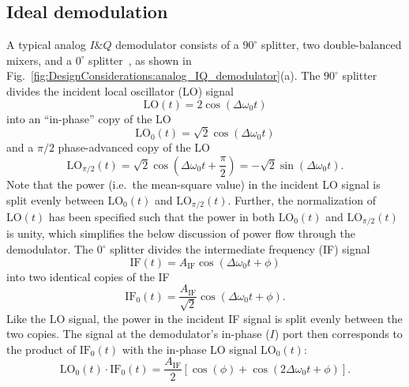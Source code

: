\subsection{Ideal demodulation}
\label{sec:DesignConsiderations:demodulation:ideal}
A typical analog $I\&Q$ demodulator consists of
a $90^{\circ}$ splitter,
two double-balanced mixers, and
a $0^{\circ}$ splitter~\cite{minicircuits_modulators}, as shown in
Fig.~\ref{fig:DesignConsiderations:analog_IQ_demodulator}(a).
The $90^{\circ}$ splitter divides the incident local oscillator (LO) signal
\begin{equation}
  \text{LO}(t) = 2 \cos(\Delta\omega_0 t)
\end{equation}
into an ``in-phase'' copy of the LO
\begin{equation}
  \text{LO}_0(t)
  =
  \sqrt{2} \cos(\Delta\omega_0 t)
\end{equation}
and a $\pi / 2$ phase-advanced copy of the LO
\begin{equation}
  \text{LO}_{\pi / 2}(t)
  =
  \sqrt{2} \cos\left( \Delta\omega_0 t + \frac{\pi}{2} \right)
  =
  -\sqrt{2} \sin(\Delta\omega_0 t).
\end{equation}
Note that the power (i.e.\ the mean-square value) in the incident LO signal
is split evenly between $\text{LO}_0(t)$ and $\text{LO}_{\pi / 2}(t)$.
Further, the normalization of $\text{LO}(t)$ has been specified such that
the power in both $\text{LO}_0(t)$ and $\text{LO}_{\pi / 2}(t)$ is unity,
which simplifies the below discussion of power flow through the demodulator.
The $0^{\circ}$ splitter divides the intermediate frequency (IF) signal
\begin{equation}
  \text{IF}(t) = A_{\text{IF}} \cos(\Delta\omega_0 t + \phi)
  \label{eq:DesignConsiderations:IF_perfect_sinusoid}
\end{equation}
into two identical copies of the IF
\begin{equation}
  \text{IF}_0(t)
  =
  \frac{A_{\text{IF}}}{\sqrt{2}} \cos(\Delta\omega_0 t + \phi).
\end{equation}
Like the LO signal, the power in the incident IF signal
is split evenly between the two copies.
The signal at the demodulator's in-phase ($I$) port
then corresponds to the product of
$\text{IF}_0(t)$ with the in-phase LO signal $\text{LO}_0(t)$:
\begin{equation}
  \text{LO}_0(t) \cdot \text{IF}_0(t)
  =
  \frac{A_{\text{IF}}}{2}
  \left[
    \cos(\phi) + \cos(2 \Delta\omega_0 t + \phi)
  \right].
\end{equation}
